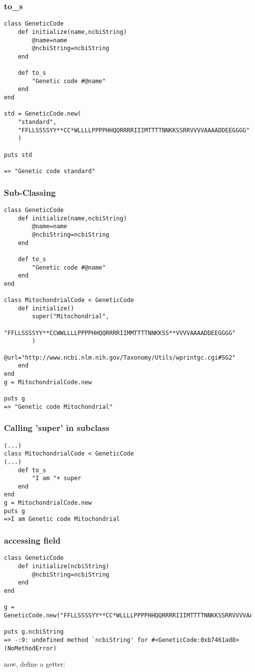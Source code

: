 \documentclass{article}
\begin{document}
\subsubsection{to\_s}
\begin{lstlisting}
class GeneticCode
	def initialize(name,ncbiString)
		@name=name
		@ncbiString=ncbiString
	end
	
	def to_s
		"Genetic code #@name"
	end
end

std = GeneticCode.new(
	"standard",
	"FFLLSSSSYY**CC*WLLLLPPPPHHQQRRRRIIIMTTTTNNKKSSRRVVVVAAAADDEEGGGG"
	)

puts std

=> "Genetic code standard"
\end{lstlisting}
\subsubsection{Sub-Classing}
\begin{lstlisting}
class GeneticCode
	def initialize(name,ncbiString)
		@name=name
		@ncbiString=ncbiString
	end
	
	def to_s
		"Genetic code #@name"
	end
end

class MitochondrialCode < GeneticCode
	def initialize()
		super("Mitochondrial",
		"FFLLSSSSYY**CCWWLLLLPPPPHHQQRRRRIIMMTTTTNNKKSS**VVVVAAAADDEEGGGG"
		)
		@url="http://www.ncbi.nlm.nih.gov/Taxonomy/Utils/wprintgc.cgi#SG2"
	end
end
g = MitochondrialCode.new

puts g
=> "Genetic code Mitochondrial"
\end{lstlisting}
\subsubsection{Calling 'super' in subclass}
\begin{lstlisting}
(...)
class MitochondrialCode < GeneticCode
(...)
	def to_s
		"I am "+ super
	end
end
g = MitochondrialCode.new
puts g
=>I am Genetic code Mitochondrial
\end{lstlisting}

\subsubsection{accessing field}
\begin{lstlisting}
class GeneticCode
	def initialize(ncbiString)
		@ncbiString=ncbiString
	end
end

g = GeneticCode.new("FFLLSSSSYY**CC*WLLLLPPPPHHQQRRRRIIIMTTTTNNKKSSRRVVVVAAAADDEEGGGG")

puts g.ncbiString
=> -:9: undefined method `ncbiString' for #<GeneticCode:0xb7461ad8> (NoMethodError)
\end{lstlisting}
now, define a getter:
\end{document}

